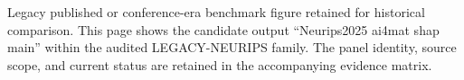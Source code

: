 Legacy published or conference-era benchmark figure retained for historical comparison. This page shows the candidate output ``Neurips2025 ai4mat shap main'' within the audited LEGACY-NEURIPS family. The panel identity, source scope, and current status are retained in the accompanying evidence matrix.
